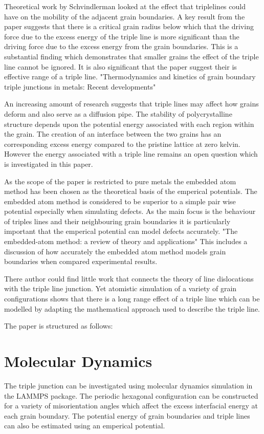 \documentclass[12pt,a4paper]{book}
\begin{document}
Theoretical work by Schvindlerman looked at the effect that triplelines could have on the mobility of the adjacent grain boundaries. A key result from the paper suggests that there is a critical grain radius below which that the driving force due to the excess energy of the triple line is more significant than the driving force due to the excess energy from the grain boundaries. This is a substantial finding which demonstrates that smaller grains the effect of the triple line cannot be ignored. It is also significant that the paper suggest their is effective range of a triple line.  "Thermodynamics and kinetics of grain boundary triple junctions in metals: Recent developments"

An increasing amount of research suggests that triple lines may affect how  grains deform and also serve as a diffusion pipe. The stability of polycrystalline structure depends upon the potential energy associated with each region within the grain. The creation of an interface between the two grains has an corresponding excess energy compared to the pristine lattice at zero kelvin. However the energy associated with a triple line remains an open question which is investigated in this paper.

As the scope of the paper is restricted to pure metals the embedded atom method has been chosen as the theoretical basis of the emperical potentials. The embedded atom method is considered to be superior to a simple pair wise potential especially when simulating defects. As the main focus is the behaviour of triples lines and their neighbouring grain boundaries it is particularly important that the emperical potential can model defects accurately. "The embedded-atom method:
a review of theory and applications" This includes a discussion of how accurately the embedded atom method models grain boundaries when compared  experimental results.

There author could find little work that connects the theory of line dislocations with the triple line junction. Yet atomistic simulation of a variety of grain configurations shows that there is a long range effect of a triple line which can be modelled by adapting the mathematical approach used to describe the triple line.  

The paper is structured as follows:

 


\chapter{Molecular Dynamics}
The triple junction can be investigated using molecular dynamics simulation in the LAMMPS package. The periodic hexagonal configuration can be constructed for a variety of misorientation angles which affect the excess interfacial energy at each grain boundary. The potential energy of grain boundaries and triple lines can also be estimated using an emperical potential.
\end{document}
